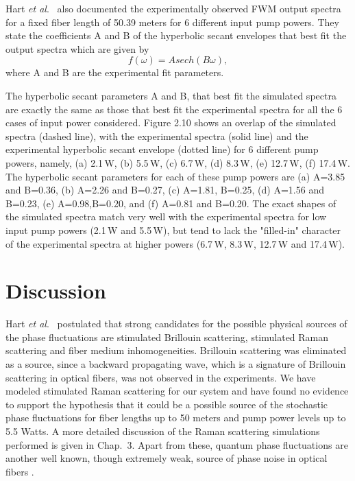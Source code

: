 Hart {\it et al}.\ \cite{hart1} also documented the experimentally observed FWM
output spectra for a fixed fiber length of 50.39 meters for 6 different input
pump powers. They state the coefficients A and B of the hyperbolic secant
envelopes that best fit the output spectra which are given by
\begin{equation}
f(\omega) = Asech(B\omega) ,
\end{equation}
where A and B are the experimental fit parameters.

The hyperbolic secant parameters A and B, that best fit the simulated spectra
are exactly the same as those that best fit the experimental spectra
\cite{hart1} for all the 6 cases of input power considered. Figure 2.10 shows an
overlap of the simulated spectra (dashed line), with the experimental spectra
(solid line) and the experimental hyperbolic secant envelope (dotted line) for
6 different pump powers, namely, (a) 2.1\,W, (b) 5.5\,W, (c) 6.7\,W, (d) 8.3\,W, (e)
12.7\,W, (f) 17.4\,W. The hyperbolic secant parameters for each of these pump
powers are (a) A=3.85 and B=0.36, (b) A=2.26 and B=0.27, (c) A=1.81, B=0.25,
(d) A=1.56 and B=0.23, (e) A=0.98,B=0.20, and (f) A=0.81 and B=0.20. The exact
shapes of the simulated spectra match very well with the experimental spectra
for low input pump powers (2.1\,W and 5.5\,W), but tend to lack the "filled-in"
character of the experimental spectra at higher powers (6.7\,W, 8.3\,W, 12.7\,W and
17.4\,W).

\section{Discussion}

Hart {\it et al}.\ \cite{hart1} postulated that strong candidates for the possible
physical sources of the phase fluctuations are stimulated Brillouin
scattering, stimulated Raman scattering and fiber medium inhomogeneities.
Brillouin scattering was eliminated as a source, since a backward propagating
wave, which is a signature of Brillouin scattering in optical fibers, was not
observed in the experiments. We have  modeled stimulated Raman scattering
\cite{Agrawal8, headley} for our system and have found no evidence to
support the hypothesis that it could be a possible source of the stochastic phase
fluctuations for fiber lengths up to 50 meters and pump power levels up to 5.5 Watts.
A more detailed discussion of the Raman scattering simulations performed is given in Chap.\ 3.
Apart from these, quantum phase fluctuations are another well
known, though extremely weak, source of phase noise in optical fibers
\cite{Agrawal2,perlmutter1}.

